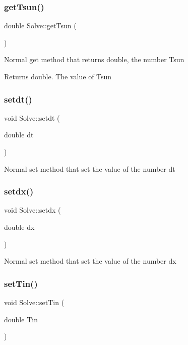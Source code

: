 \subsubsection{\texorpdfstring{get\+Tsun()}{getTsun()}}
{\footnotesize\ttfamily double Solve\+::get\+Tsun (\begin{DoxyParamCaption}{ }\end{DoxyParamCaption})}

Normal get method that returns double, the number Tsun \begin{DoxyReturn}{Returns}
double. The value of Tsun 
\end{DoxyReturn}
\mbox{\label{class_solve_af05556226469b3b7d4773b61342fbf73}} 
\subsubsection{\texorpdfstring{setdt()}{setdt()}}
{\footnotesize\ttfamily void Solve\+::setdt (\begin{DoxyParamCaption}\item[{double}]{dt }\end{DoxyParamCaption})}

Normal set method that set the value of the number dt \mbox{\label{class_solve_a60a27ba683584477189dc9c260c75127}} 
\subsubsection{\texorpdfstring{setdx()}{setdx()}}
{\footnotesize\ttfamily void Solve\+::setdx (\begin{DoxyParamCaption}\item[{double}]{dx }\end{DoxyParamCaption})}

Normal set method that set the value of the number dx \mbox{\label{class_solve_acef277ebf827a664b4378285a1fbeca3}} 
\subsubsection{\texorpdfstring{set\+Tin()}{setTin()}}
{\footnotesize\ttfamily void Solve\+::set\+Tin (\begin{DoxyParamCaption}\item[{double}]{Tin }\end{DoxyParamCaption})}

